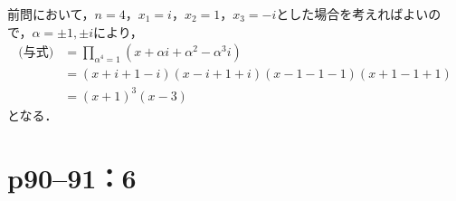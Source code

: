 \documentclass[a4paper,10pt,fleqn]{ltjsarticle}
\begin{document}
\begin{leftbar}
    前問において，$n=4$，$x_1 = i$，$x_2 = 1$，$x_3=-i$とした場合を考えればよいので，$\alpha = \pm 1 , \pm i$により，
    \begin{align*}
        \text{(与式)} & = \prod_{\alpha^4=1} (x+ \alpha i +\alpha^2 -  \alpha^3i ) \\
                    & = (x+i+1-i) (x-i+1+i)(x-1-1-1)(x+1-1+1)                    \\
                    & =(x+1)^3(x-3)
    \end{align*}
    となる．
\end{leftbar}

\newpage

\section*{p90--91：6}
\end{document}
